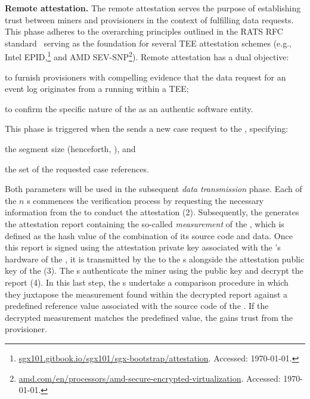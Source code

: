 \noindent\textbf{Remote attestation.} The remote attestation serves the purpose of establishing trust between miners and provisioners in the context of fulfilling data requests. This phase adheres to the overarching principles outlined in the RATS RFC standard~\citep{rfc9334} serving as the foundation for several TEE attestation schemes (e.g., Intel EPID,\footnote{\url{sgx101.gitbook.io/sgx101/sgx-bootstrap/attestation}. Accessed: \today.} and AMD SEV-SNP\footnote{\url{amd.com/en/processors/amd-secure-encrypted-virtualization}. Accessed: \today.}). Remote attestation has a dual objective:
\begin{inparaenum}
    \item to furnish provisioners with compelling evidence that the data request for an event log originates from a  running within a TEE;
    \item to confirm the specific nature of the  as an authentic  software entity.
\end{inparaenum}
This phase is triggered when the  sends a new case request to the , specifying:
\begin{inparaenum}
    \item the segment size (henceforth, \SegSize), and
    \item the set of the requested case references.
\end{inparaenum}
Both parameters will be used in the subsequent \textit{data transmission} phase. Each of the $n$ s commences the verification process by requesting the necessary information from the  to conduct the attestation (2). Subsequently, the  generates the attestation report containing the so-called \emph{measurement} of the , which is defined as the hash value of the combination of its source code and data. Once this report is signed using the attestation private key associated with the 's hardware of the , it is transmitted by the  to the s alongside the attestation public key of the  (3). The s authenticate the miner using the public key and decrypt the report (4). In this last step, the s undertake a comparison procedure in which they juxtapose the measurement found within the decrypted report against a predefined reference value associated with the source code of the . If the decrypted measurement matches the predefined value, the  gains trust from the provisioner.


